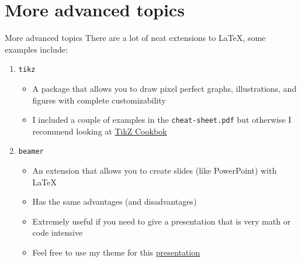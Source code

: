 \documentclass[10pt]{beamer}
\begin{document}
\section*{More advanced topics}
\begin{frame}{More advanced topics}
    There are a lot of \alert{neat extensions} to \LaTeX, \: some examples include:
    \begin{enumerate}
        \item \texttt{tikz}
        \begin{itemize}
            \item A package that allows you to draw pixel perfect graphs, illustrations, and figures with complete customizability
            \item I included a couple of examples in the \texttt{cheat-sheet.pdf} but otherwise I recommend looking at \href{https://sites.google.com/site/kochiuyu/Tikz}{\color{blue}TikZ Cookbok}
        \end{itemize}
        \item \texttt{beamer}
        \begin{itemize}
            \item An extension that allows you to create slides (like PowerPoint) with \LaTeX
            \item Has the same advantages (and disadvantages)
            \item Extremely useful if you need to give a presentation that is very math or code intensive 
            \item Feel free to use my theme for this  \href{https://github.com/carlepless/latex-introduction/blob/main/presentation/presentation.tex}{\color{blue}presentation}
        \end{itemize}
    \end{enumerate}
\end{frame}
\end{document}
